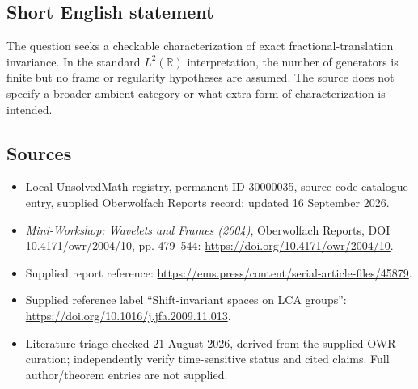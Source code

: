 \documentclass[11pt]{article}
\newcommand{\R}{\mathbb{R}}
\begin{document}
\subsection{Short English statement}
The question seeks a checkable characterization of exact fractional-translation invariance. In the standard $L^2(\R)$ interpretation, the number of generators is finite but no frame or regularity hypotheses are assumed. The source does not specify a broader ambient category or what extra form of characterization is intended.
\subsection{Sources}
\begin{itemize}
\item Local UnsolvedMath registry, permanent ID 30000035, source code catalogue entry, supplied Oberwolfach Reports record; updated 16 September 2026.
\item \emph{Mini-Workshop: Wavelets and Frames (2004)}, Oberwolfach Reports, DOI 10.4171/owr/2004/10, pp. 479--544: \url{https://doi.org/10.4171/owr/2004/10}.
\item Supplied report reference: \url{https://ems.press/content/serial-article-files/45879}.
\item Supplied reference label ``Shift-invariant spaces on LCA groups'': \url{https://doi.org/10.1016/j.jfa.2009.11.013}.
\item Literature triage checked 21 August 2026, derived from the supplied OWR curation; independently verify time-sensitive status and cited claims. Full author/theorem entries are not supplied.
\end{itemize}
\end{document}
